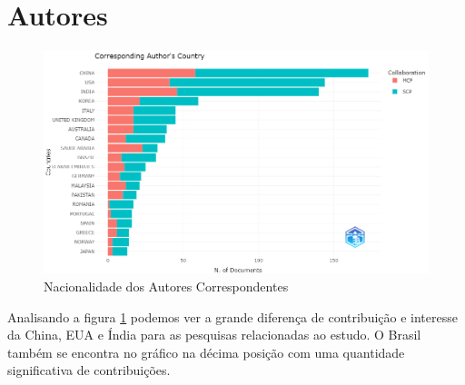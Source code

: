 \section{Autores}

\begin{figure}[H]
    \centering
    \includegraphics[width=1\textwidth]{experiments/brunoedcf/AnaliseBibliometrica/BlockchainInHealth/Figures/Countries.png}
    \caption{Nacionalidade dos Autores Correspondentes}
    \label{fig:brunoedcf/Countries}
\end{figure}

Analisando a figura \ref{fig:brunoedcf/Countries} podemos ver a grande diferença de contribuição e interesse da China, EUA e Índia para as pesquisas
relacionadas ao estudo. O Brasil também se encontra no gráfico na décima posição com uma quantidade significativa de contribuições.